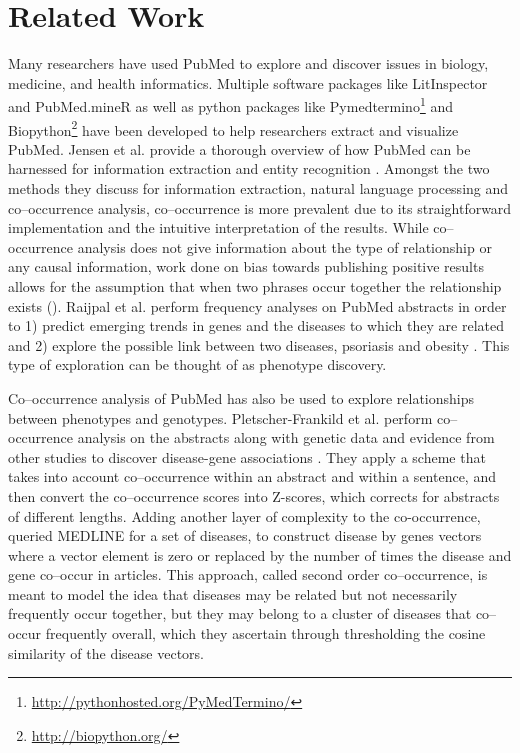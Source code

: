 \documentclass{sig-alternate-05-2015}
\begin{document}
\section{Related Work}
Many researchers have used PubMed to explore and discover issues in biology, medicine, and health informatics.
Multiple software packages like LitInspector \cite{frisch2009litinspector} and PubMed.mineR as well as python packages like Pymedtermino\footnote{\url{http://pythonhosted.org/PyMedTermino/}} and Biopython\footnote{\url{http://biopython.org/}} have been developed to help researchers extract and visualize PubMed.
Jensen et al. provide a thorough overview of how PubMed can be harnessed for information extraction and entity recognition \cite{jensen2006literature}.
Amongst the two methods they discuss for information extraction, natural language processing and co--occurrence analysis, co--occurrence is more prevalent due to its straightforward implementation and the intuitive interpretation of the results.
While co--occurrence analysis does not give information about the type of relationship or any causal information, work done on bias towards publishing positive results allows for the assumption that when two phrases occur together the relationship exists (\cite{dickersin1990existence,easterbrook1991publication,stern1997publication}).
Raijpal et al. perform frequency analyses on PubMed abstracts in order to 1) predict emerging trends in genes and the diseases to which they are related and 2) explore the possible link between two diseases, psoriasis and obesity \cite{rajpal2014mining}. 
This type of exploration can be thought of as phenotype discovery.

Co--occurrence analysis of PubMed has also be used to explore relationships between phenotypes and genotypes.
Pletscher-Frankild et al. perform co--occurrence analysis on the abstracts along with genetic data and evidence from other studies to discover disease-gene associations \cite{pletscher2015diseases}.
They apply a scheme that takes into account co--occurrence within an abstract and within a sentence, and then convert the co--occurrence scores into Z-scores, which corrects for abstracts of different lengths.
Adding another layer of complexity to the co-occurrence, \cite{von2015data} queried MEDLINE for a set of diseases, to construct disease by genes vectors where a vector element is zero or replaced by the number of times the disease and gene co--occur in articles. 
This approach, called second order co--occurrence, is meant to model the idea that diseases may be related but not necessarily frequently occur together, but they may belong to a cluster of diseases that co--occur frequently overall, which they ascertain through thresholding the cosine similarity of the disease vectors.
\end{document}
